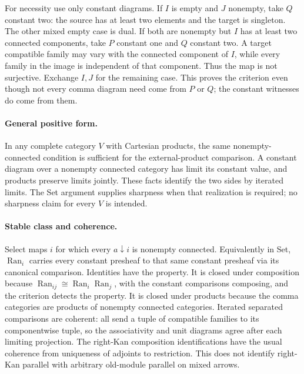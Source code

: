 \documentclass{article}
\begin{document}
For necessity use only constant diagrams. If $I$ is empty and $J$ nonempty, take $Q$ constant two: the source has at least two elements and the target is singleton. The other mixed empty case is dual. If both are nonempty but $I$ has at least two connected components, take $P$ constant one and $Q$ constant two. A target compatible family may vary with the connected component of $I$, while every family in the image is independent of that component. Thus the map is not surjective. Exchange $I,J$ for the remaining case. This proves the criterion even though not every comma diagram need come from $P$ or $Q$; the constant witnesses do come from them.

\paragraph{General positive form.} In any complete category $V$ with Cartesian products, the same nonempty-connected condition is sufficient for the external-product comparison. A constant diagram over a nonempty connected category has limit its constant value, and products preserve limits jointly. These facts identify the two sides by iterated limits. The Set argument supplies sharpness when that realization is required; no sharpness claim for every $V$ is intended.

\paragraph{Stable class and coherence.} Select maps $i$ for which every $a\downarrow i$ is nonempty connected. Equivalently in Set, $\operatorname{Ran}_i$ carries every constant presheaf to that same constant presheaf via its canonical comparison. Identities have the property. It is closed under composition because $\operatorname{Ran}_{ij}\cong\operatorname{Ran}_i\operatorname{Ran}_j$, with the constant comparisons composing, and the criterion detects the property. It is closed under products because the comma categories are products of nonempty connected categories. Iterated separated comparisons are coherent: all send a tuple of compatible families to its componentwise tuple, so the associativity and unit diagrams agree after each limiting projection. The right-Kan composition identifications have the usual coherence from uniqueness of adjoints to restriction. This does not identify right-Kan parallel with arbitrary old-module parallel on mixed arrows.
\end{document}
